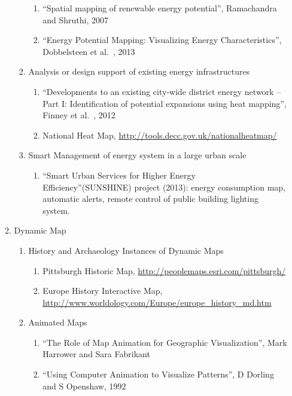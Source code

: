 \documentclass[12pt]{article}
\begin{document}
\begin{enumerate}
\begin{enumerate}[label*=\arabic*.]
\begin{enumerate}[label*=\arabic*.]
\begin{enumerate}[label*=\arabic*.]
      \item ``Spatial mapping of renewable energy potential'',
        Ramachandra and Shruthi, 2007
      \item ``Energy Potential Mapping: Visualizing Energy
        Characteristics'', Dobbelsteen et al.\ , 2013
      \end{enumerate}
    \item Analysis or design support of existing energy infrastructures
      \begin{enumerate}[label*=\arabic*.]
      \item ``Developments to an existing city-wide district energy
        network – Part I: Identification of potential expansions using
        heat mapping'', Finney et al.\ , 2012
      \item National Heat Map, \url{http://tools.decc.gov.uk/nationalheatmap/}
      \end{enumerate}
    \item Smart Management of energy system in a large urban scale
      \begin{enumerate}[label*=\arabic*.]
      \item ``Smart Urban Services for Higher Energy
        Efficiency''(SUNSHINE) project (2013): energy consumption map,
        automatic alerts, remote control of public building lighting
        system.
      \end{enumerate}
    \end{enumerate}
  \item Dynamic Map
    \begin{enumerate}[label*=\arabic*.]
    \item History and Archaeology Instances of Dynamic Maps
      \begin{enumerate}[label*=\arabic*.]
      \item Pittsburgh Historic Map, \url{http://peoplemaps.esri.com/pittsburgh/} 
      \item Europe History Interactive Map, \url{http://www.worldology.com/Europe/europe\_history\_md.htm}
      \end{enumerate}
    \item Animated Maps
      \begin{enumerate}[label*=\arabic*.]
      \item ``The Role of Map Animation for Geographic
        Visualization'', Mark Harrower and Sara Fabrikant
      \item ``Using Computer Animation to Visualize Patterns'', D Dorling and S Openshaw, 1992

\end{enumerate}
\end{enumerate}
\end{enumerate}
\end{enumerate}
\end{document}
